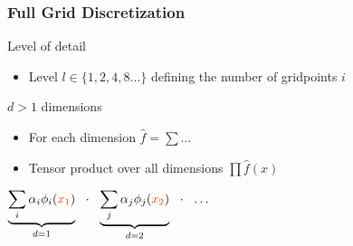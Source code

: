\begin{frame}
  \frametitle{Full Grid Discretization}
  \topline
  \vspace{-10px}
  \begin{block}{Level of detail}
    \begin{itemize}
    \item Level $l \in \{1,2,4,8\dots\}$ defining the number of gridpoints $i$
    \end{itemize}
  \end{block}
  \begin{block}{$d > 1$ dimensions}
    \begin{itemize}
    \item For each dimension $\hat{f} = \sum{\dots}$
    \item Tensor product over all dimensions $\prod{ \hat{f}(x) }$
    \end{itemize}
    \vspace{7px}
    \begin{center}
      $\underbrace{
        \sum_i{\alpha_i \phi_i(\color{uipoppy}{x_1}\color{black}{)}}
      }_{d = 1}
      \ \
      \cdot
      \ \
      \underbrace{
        \sum_j{\alpha_j \phi_j(\color{uipoppy}{x_2}\color{black}{)}}
      }_{d = 2}
      \ \
      \cdot
      \ \
      \dots$
    \end{center}
  \end{block}
\end{frame}

